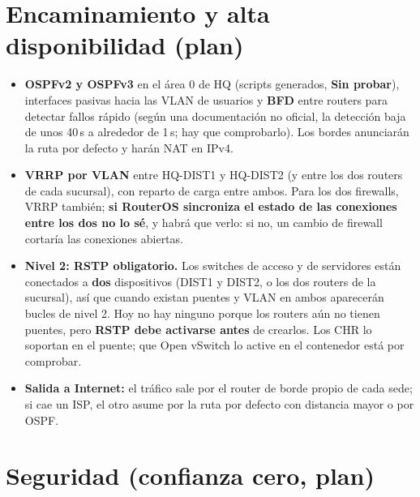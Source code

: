 \documentclass[11pt,a4paper]{article}
\newcommand{\sinp}{\textcolor{naranja}{\textbf{Sin probar}}}
\begin{document}
\section{Encaminamiento y alta disponibilidad (plan)}\label{sec:ha}
\begin{itemize}
\item \textbf{OSPFv2 y OSPFv3} en el área 0 de HQ (scripts generados, \sinp), interfaces pasivas hacia las VLAN de usuarios y \textbf{BFD} entre routers para detectar fallos rápido (según una documentación no oficial, la detección baja de unos 40\,s a alrededor de 1\,s; hay que comprobarlo). Los bordes anunciarán la ruta por defecto y harán NAT en IPv4.
\item \textbf{VRRP por VLAN} entre HQ-DIST1 y HQ-DIST2 (y entre los dos routers de cada sucursal), con reparto de carga entre ambos. Para los dos firewalls, VRRP también; \textbf{si RouterOS sincroniza el estado de las conexiones entre los dos no lo sé}, y habrá que verlo: si no, un cambio de firewall cortaría las conexiones abiertas.
\item \textbf{Nivel 2: RSTP obligatorio.} Los switches de acceso y de servidores están conectados a \textbf{dos} dispositivos (DIST1 y DIST2, o los dos routers de la sucursal), así que cuando existan puentes y VLAN en ambos aparecerán bucles de nivel 2. Hoy no hay ninguno porque los routers aún no tienen puentes, pero \textbf{RSTP debe activarse antes} de crearlos. Los CHR lo soportan en el puente; que Open vSwitch lo active en el contenedor está por comprobar.
\item \textbf{Salida a Internet:} el tráfico sale por el router de borde propio de cada sede; si cae un ISP, el otro asume por la ruta por defecto con distancia mayor o por OSPF.
\end{itemize}

\section{Seguridad (confianza cero, plan)}
\end{document}

